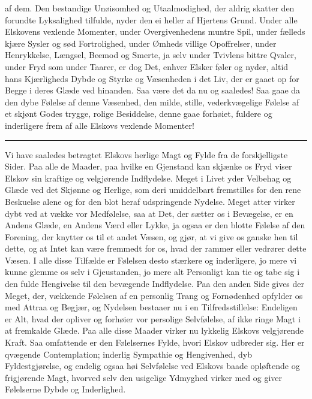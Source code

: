 \documentclass[12pt,a4paper]{book}
\newcommand{\apage}[1]{\marginnote{\footnotesize\textit{[#1]}}}
\begin{document}
af dem. Den bestandige Unøisomhed og Utaalmodighed, der aldrig skatter
den forundte Lyksalighed tilfulde, nyder den ei heller af Hjertens
Grund. Under alle Elskovens vexlende Momenter, under Overgivenhedens
muntre Spil, under fælleds kjære Sysler og sød Fortrolighed, under
Ømheds villige Opoffrelser, under Henrykkelse, Længsel, Beemod og
Smerte, ja selv under Tvivlens bittre Qvaler, under Fryd som under
Taarer, er dog Det, enhver Elsker føler og nyder, altid hans Kjærligheds
Dybde og Styrke og Væsenheden i det Liv, der er gaaet op for Begge i
deres Glæde ved hinanden. Saa være det da nu og saaledes! Saa gaae da
den dybe Følelse af denne Væsenhed, den milde, stille, vederkvægelige
Følelse af et skjønt Godes trygge, rolige Besiddelse, denne gaae
forhøiet, fuldere og inderligere frem af alle Elskovs vexlende
Momenter!

\begin{center}\rule{0.28\linewidth}{0.4pt}\end{center}

Vi have saaledes betragtet Elskovs herlige Magt og Fylde fra de
forskjelligste Sider. Paa alle de Maader, paa hvilke en Gjenstand kan
skjænke os Fryd viser \apage{56} Elskov sin kraftige og velgjørende Indflydelse.
Meget i Livet yder Velbehag og Glæde ved det Skjønne og Herlige, som
deri umiddelbart fremstilles for den rene Beskuelse alene og for den
blot heraf udspringende Nydelse. Meget atter virker dybt ved at vække
vor Medfølelse, saa at Det, der sætter os i Bevægelse, er en Andens
Glæde, en Andens Værd eller Lykke, ja ogsaa er den blotte Følelse af den
Forening, der knytter os til et andet Væsen, og gjør, at vi give os
ganske hen til dette, og at Intet kan være fremmedt for os, hvad der
rammer eller vedrører dette Væsen. I alle disse Tilfælde er Følelsen
desto stærkere og inderligere, jo mere vi kunne glemme os selv i
Gjeustanden, jo mere alt Personligt kan tie og tabe sig i den fulde
Hengivelse til den bevægende Indflydelse. Paa den anden Side gives der
Meget, der, vækkende Følelsen af en personlig Trang og Fornødenhed
opfylder os med Attraa og Begjær, og Nydelsen bestaaer nu i en
Tilfredsstillelse: Endeligen er Alt, hvad der opliver og forhøier vor
persolige Selvfølelse, af ikke ringe Magt i at fremkalde Glæde. Paa
alle disse Maader virker nu lykkelig Elskovs velgjørende Kraft. Saa
omfattende er den Følelsernes Fylde, hvori Elskov udbreder sig. Her er
qvægende Contemplation; inderlig Sympathie og Hengivenhed, dyb
Fyldestgjørelse, og endelig ogsaa høi Selvfølelse ved Elskovs baade
opløftende og frigjørende Magt, hvorved selv den usigelige Ydmyghed
virker med og giver Følelserne Dybde og Inderlighed. \apage{57}
\end{document}
